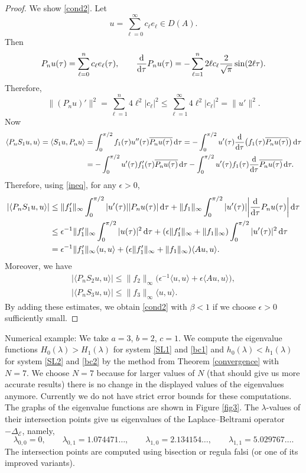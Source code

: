 \documentclass[pdftex]{sigma}
\newcommand{\E}{\mathcal{E}}
\newcommand{\D}{\Delta_\E}
\numberwithin{equation}{section}
\begin{document}
\begin{proof}
We show \eqref{cond2}.
Let
\[ u=\sum_{\ell=0}^\infty c_\ell e_\ell \in D(A) .\]
Then
\[ P_n u(\tau)=\sum_{\ell=0}^n c_\ell e_\ell(\tau),\qquad \frac{{\rm d}}{{\rm d}\tau} P_n u(\tau)= -\sum_{\ell=1}^n 2\ell c_\ell\frac{2}{\sqrt\pi}\sin(2\ell \tau).\]
Therefore,
\begin{equation}\label{ineq}
 \|(P_n u)'\|^2=\sum_{\ell=1}^n 4\ell^2 |c_\ell|^2\le \sum_{\ell=1}^\infty 4\ell^2|c_\ell|^2=\|u'\|^2.
\end{equation}
Now
 \begin{align*}
\langle P_nS_1u,u\rangle=\langle S_1u,P_nu\rangle &{}=\int_0^{\pi/2} f_1(\tau)u''(\tau)\overline{P_n u(\tau)}\,{\rm d}\tau
 = -\int_0^{\pi/2} u'(\tau)\frac{{\rm d}}{{\rm d}\tau}\bigl( f_1(\tau)\overline{P_n u(\tau)}\bigr)\,{\rm d}\tau\\
&{}= - \int_0^{\pi/2} u'(\tau)f_1'(\tau)\overline{P_n u(\tau)}\,{\rm d}\tau-\int_0^{\pi/2} u'(\tau)f_1(\tau)\frac{{\rm d}}{{\rm d}\tau}\overline{P_n u(\tau)}\,{\rm d}\tau.
\end{align*}
Therefore, using \eqref{ineq}, for any $\epsilon>0$,
\begin{align*}
|\langle P_nS_1u,u\rangle|&\le \|f_1'\|_\infty \int_0^{\pi/2} |u'(\tau)||P_n u(\tau)|\,{\rm d}\tau +\|f_1\|_\infty \int_0^{\pi/2} |u'(\tau)|\biggl|\frac{{\rm d}}{{\rm d}\tau}P_n u(\tau)\biggr|\,{\rm d}\tau\\
&\le
\epsilon^{-1}\|f_1'\|_\infty\int_0^{\pi/2} |u(\tau)|^2\,{\rm d}\tau +
(\epsilon\|f_1'\|_\infty +\|f_1\|_\infty)\int_0^{\pi/2} |u'(\tau)|^2\,{\rm d}\tau\\
&= \epsilon^{-1}\|f_1'\|_\infty\langle u,u\rangle +(\epsilon\|f_1'\|_\infty+\|f_1\|_\infty) \langle Au,u\rangle .
\end{align*}
Moreover, we have
\begin{gather*}
|\langle P_n S_2u,u\rangle|\le \|f_2\|_\infty \bigl(\epsilon^{-1} \langle u,u\rangle +\epsilon \langle Au,u\rangle\bigr),\\
|\langle P_nS_3u,u\rangle|\le \|f_3\|_\infty \langle u,u\rangle.
\end{gather*}
By adding these estimates, we obtain \eqref{cond2}
with $\beta<1$ if we choose $\epsilon>0$ sufficiently small.
\end{proof}

Numerical example:
We take $a=3$, $b=2$, $c=1$. We compute the eigenvalue functions $H_0(\lambda)>H_1(\lambda)$ for system \eqref{SL1} and \eqref{bc1}
and $h_0(\lambda)<h_1(\lambda)$ for system \eqref{SL2} and \eqref{bc2} by the method from Theorem \ref{convergence} with $N=7$.
We choose $N=7$ because for larger values of $N$ (that should give us more accurate results) there is no change in the displayed values of the eigenvalues anymore. Currently we do not have strict error bounds for these computations.
The graphs of the eigenvalue functions are shown in Figure \ref{fig3}.
The $\lambda$-values of their intersection points give us eigenvalues of the Laplace--Beltrami operator $-\D$,
namely,
\[ \lambda_{0,0}=0,\qquad \lambda_{0,1}=1.074471\dots,\qquad \lambda_{1,0}=2.134154\dots,\qquad
\lambda_{1,1}=5.029767\dots .\]
The intersection points are computed using bisection or regula falsi (or one of its improved variants).
\end{document}
